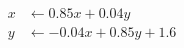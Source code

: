 \documentclass[preview]{standalone}
\begin{document}
\begin{align*}
x &\leftarrow 0.85 x + 0.04 y \\ y &\leftarrow -0.04 x + 0.85 y + 1.6
\end{align*}
\end{document}
